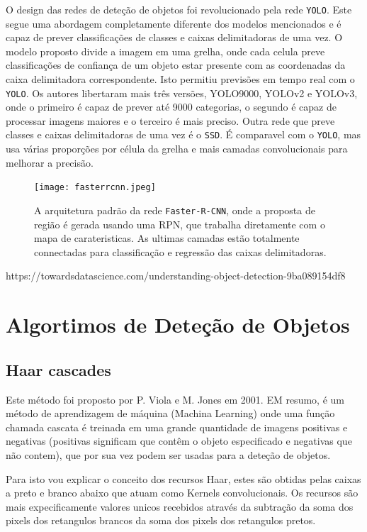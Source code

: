 O design das redes de deteção de objetos foi revolucionado pela rede \texttt{\ac{YOLO}}. Este segue uma abordagem completamente diferente dos modelos mencionados e é capaz de prever classificações de classes e caixas delimitadoras de uma vez. O modelo proposto divide a imagem em uma grelha, onde cada celula preve classificações de confiança de um objeto estar presente com as coordenadas da caixa delimitadora correspondente. Isto permitiu previsões em tempo real com o \texttt{\ac{YOLO}}. Os autores libertaram mais três versões, YOLO9000, YOLOv2 e YOLOv3, onde o primeiro é capaz de prever até 9000 categorias, o segundo é capaz de processar imagens maiores e o terceiro é mais preciso. Outra rede que preve classes e caixas delimitadoras de uma vez é o \texttt{\ac{SSD}}. É comparavel com o \texttt{\ac{YOLO}}, mas usa várias proporções por célula da grelha e mais camadas convolucionais para melhorar a precisão.


\begin{figure}[h!]
  \label{img:fasterrcnn}
  \texttt{[image: fasterrcnn.jpeg]}
  \caption{A arquitetura padrão da rede \texttt{Faster-\ac{R-CNN}}, onde a proposta de região é gerada usando uma RPN, que trabalha diretamente com o mapa de carateristicas. As ultimas camadas estão totalmente connectadas para classificação e regressão das caixas delimitadoras.}
\end{figure}


https://towardsdatascience.com/understanding-object-detection-9ba089154df8


\section{Algortimos de Deteção de Objetos}
\label{chap2:subsec:algoritmosdetecao}

\subsection{Haar cascades}

Este método foi proposto por P. Viola e M. Jones em 2001. EM resumo, é um método de aprendizagem de máquina (Machina Learning) onde uma função chamada cascata é treinada em uma grande quantidade de imagens positivas e negativas (positivas significam que contêm o objeto especificado e negativas que não contem), que por sua vez podem ser usadas para a deteção de objetos.

Para isto vou explicar o conceito dos recursos Haar, estes são obtidas pelas caixas a preto e branco abaixo que atuam como Kernels convolucionais. Os recursos são mais expecificamente valores unicos recebidos através da subtração da soma dos pixels dos retangulos brancos da soma dos pixels dos retangulos pretos.


